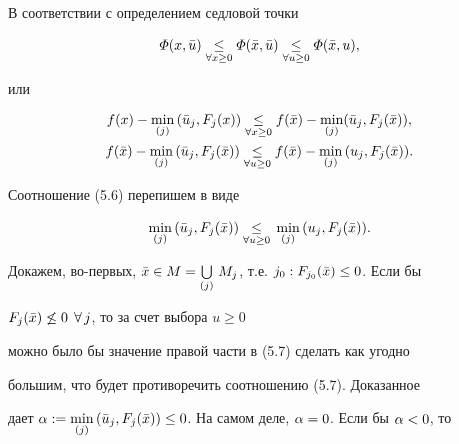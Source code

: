 \begin{pf} В соответствии с определением седловой точки


$$


\varPhi (x, \Bar{u})


\underset{\forall x\ge 0}{\le}{}


\varPhi (\Bar{x}, \Bar{u})


\underset{\forall u\ge 0}{\le}{}


\varPhi (\Bar{x}, u),


$$


или


\begin{gather}


f(x) -\min_{(j)}\, (\Bar{u}_j, F_j(x))


\underset{\forall x\ge 0}{\le}{}


f(\Bar{x}) -\min_{(j)} (\Bar{u}_j, F_j(\Bar{x})),\\


%


f(\bar{x}) -\min_{(j)}\, (\bar{u}_j, F_j (\bar{x}))


\underset{\forall u\ge 0}{\le}{}


f(\Bar{x}) -\min_{(j)}\, (u_j, F_j (\Bar{x})).


\end{gather}


Соотношение (5.6) перепишем в виде


\begin{equation}


\min_{(j)}\, (\Bar{u}_j, F_j (\Bar{x}))


\underset{\forall u\ge 0}{\le}{}


\min_{(j)}\, (u_j, F_j (\Bar{x})).


\end{equation}


Докажем, во-первых, $\Bar{x} \in M = \bigcup\limits_{(j)}\,


M_j$, т.е. $j_0: F_{j_0} (\Bar{x}) \le 0$. Если бы


$F_j (\Bar{x}) \not\le 0$ $\forall\, j$, то за счет выбора $u \ge 0$


можно было бы значение правой части в (5.7) сделать как угодно


большим, что будет противоречить соотношению (5.7). Доказанное


дает $\al:= \min\limits_{(j)}\, (\Bar{u}_j, F_j (\Bar{x})) \le


0$. На самом деле, $\al = 0$. Если бы $\al < 0$, то



\end{pf}

